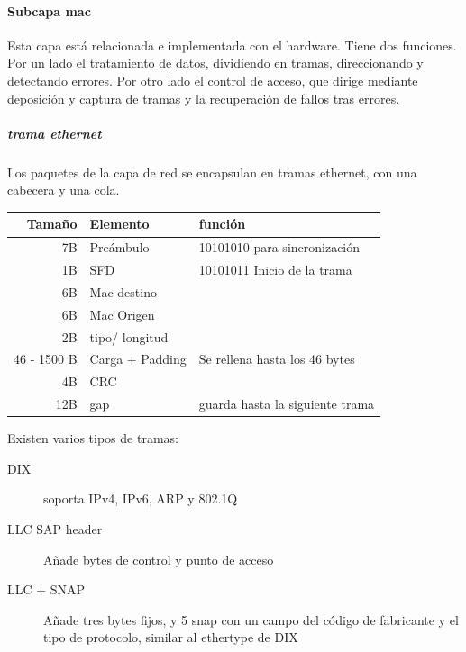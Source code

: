         \paragraph{Subcapa mac} %
            Esta capa está relacionada e implementada con el hardware. Tiene dos funciones. Por un lado el tratamiento de datos, dividiendo en tramas, direccionando y detectando errores. Por otro lado el control de acceso, que dirige mediante deposición y captura de tramas y la recuperación de fallos tras errores.
            
            \subparagraph{trama ethernet} %
                Los paquetes de la capa de red se encapsulan en tramas ethernet, con una cabecera y una cola.
                \begin{table}[H]
                \begin{tabular}{rll}
                    Tamaño & Elemento & función \\
                    \midrule
                    7B & Preámbulo & 10101010 para sincronización\\
                    1B & SFD & 10101011 Inicio de la trama  \\
                    6B & Mac destino & \\
                    6B & Mac Origen & \\
                    2B & tipo/ longitud & \\
                    46 - 1500 B & Carga + Padding & Se rellena hasta los 46 bytes\\
                    \midrule
                    4B & CRC \\
                    12B & gap & guarda hasta la siguiente trama\\
                \end{tabular}
                \end{table}

                Existen varios tipos de tramas:
                \begin{description}
                    \item[DIX] soporta IPv4, IPv6, ARP y 802.1Q
                    \item[LLC SAP header] Añade bytes de control y punto de acceso
                    \item[LLC + SNAP] Añade tres bytes fijos, y 5 snap con un campo del código de fabricante y el tipo de protocolo, similar al ethertype de DIX
                \end{description}

